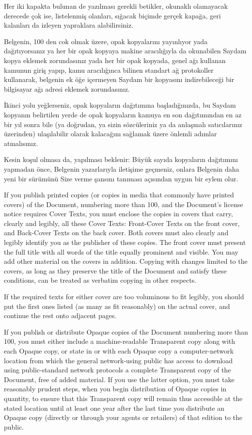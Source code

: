 \begin{multicols}{2}
Her iki kapakta bulunan de yazılması gerekli betikler, okunaklı olamayacak derecede çok ise, listelenmiş olanları, sığacak biçimde gerçek kapağa, geri kalanları da izleyen yapraklara alabilirsiniz.

Belgenin, 100 den cok olmak üzere, opak kopyalarını yayınlıyor yada dağıtıyorsanız ya her bir opak kopyaya  makine aracılığıyla da okunabilen Saydam kopya eklemek zorundasınız yada her bir opak kopyada, genel ağı kullanan kamunun giriş yapıp, kamu aracılığınca bilinen standart ağ protokoller kullanarak, belgenin ek öğe içermeyen Saydam bir kopyasını indirebileceği bir bilgisayar ağı adresi eklemek zorundasınız.

İkinci yolu yeğlerseniz, opak kopyaların dağıtımına başladığınızda, bu Saydam kopyanın belirtilen yerde de opak kopyaların kamuya en son dağıtımından en az bir yıl sonra bile (ya doğrudan, ya sizin sözcüleriniz ya da anlaşmalı satıcılarınız üzerinden) ulaşılabilir olarak kalacağını sağlamak üzere önlemli adımlar atmalısınız.

Kesin koşul olmasa da, yapılması beklenir: Büyük sayıda kopyaların dağıtımını yapmadan önce, Belgenin yazarlarıyla iletişime geçmeniz, onlara Belgenin daha yeni bir sürümünü Size verme şansını tanıması açısından uygun bir eylem olur.

\begin{ingliz}
If you publish printed copies (or copies in media that
commonly have printed covers) of the Document, numbering more
than 100, and the Document's license notice requires
Cover Texts, you must enclose the copies in covers that carry,
clearly and legibly, all these Cover Texts: Front-Cover Texts
on the front cover, and Back-Cover Texts on the back cover.
Both covers must also clearly and legibly identify you as the
publisher of these copies.  The front cover must present the
full title with all words of the title equally prominent and
visible.  You may add other material on the covers in
addition.  Copying with changes limited to the covers, as long
as they preserve the title of the Document and satisfy these
conditions, can be treated as verbatim copying in other
respects.

If the required texts for either cover are too voluminous
to fit legibly, you should put the first ones listed (as many
as fit reasonably) on the actual cover, and continue the rest
onto adjacent pages.

If you publish or distribute Opaque copies of the Document
numbering more than 100, you must either include a
machine-readable Transparent copy along with each Opaque copy,
or state in or with each Opaque copy a computer-network
location from which the general network-using public has
access to download using public-standard network protocols a
complete Transparent copy of the Document, free of added
material.  If you use the latter option, you must take
reasonably prudent steps, when you begin distribution of
Opaque copies in quantity, to ensure that this Transparent
copy will remain thus accessible at the stated location until
at least one year after the last time you distribute an Opaque
copy (directly or through your agents or retailers) of that
edition to the public.


\end{ingliz}
\end{multicols}
